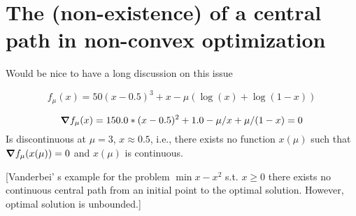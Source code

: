 \documentclass{article}
\begin{document}
\section{The (non-existence) of a central path in non-convex optimization}\label{app:non-existence-of-central-path}

Would be nice to have a long discussion on this issue

$$
f_{\mu}(x) = 50 (x - 0.5)^3 + x - \mu (\log(x) + \log(1 - x))
$$

$$
\grad f_{\mu}(x) = 150.0 * (x - 0.5)^2 + 1.0  - \mu / x + \mu / (1 - x) = 0 \\
$$
Is discontinuous at $\mu = 3$, $x \approx 0.5$, i.e., there exists no function $x(\mu)$ such that $\grad f_{\mu}(x(\mu)) = 0$ and $x(\mu)$ is continuous. 

[Vanderbei' s example for the problem $\min{ x -x^2}$ s.t. $x \ge 0$ there exists no continuous central path from an initial point to the optimal solution. However, optimal solution is unbounded.]
\end{document}
